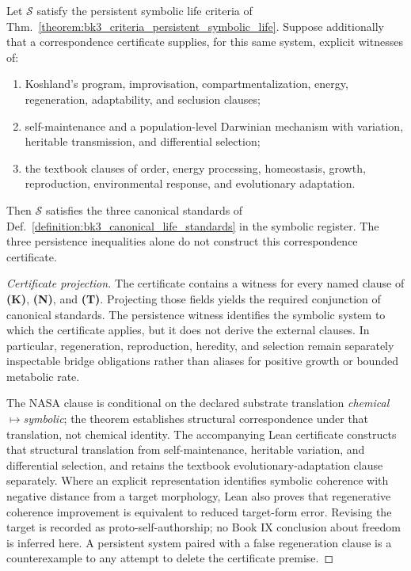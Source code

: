 \begin{theorem}
\label{theorem:bk3_symbolic_life_satisfies_canonical_definitions}
Let $\mathcal S$ satisfy the persistent symbolic life criteria of
Thm.~\ref{theorem:bk3_criteria_persistent_symbolic_life}.  Suppose additionally
that a correspondence certificate supplies, for this same system, explicit
witnesses of:
\begin{enumerate}
  \item Koshland's program, improvisation, compartmentalization, energy,
  regeneration, adaptability, and seclusion clauses;
  \item self-maintenance and a population-level Darwinian mechanism with
  variation, heritable transmission, and differential selection;
  \item the textbook clauses of order, energy processing, homeostasis, growth,
  reproduction, environmental response, and evolutionary adaptation.
\end{enumerate}
Then $\mathcal S$ satisfies the three canonical standards of
Def.~\ref{definition:bk3_canonical_life_standards} in the symbolic register.
The three persistence inequalities alone do not construct this correspondence
certificate.
\end{theorem}

\begin{proof}[Certificate projection]
\label{proof:bk3_symbolic_life_satisfies_canonical_definitions}
\leavevmode
The certificate contains a witness for every named clause of \textbf{(K)},
\textbf{(N)}, and \textbf{(T)}.  Projecting those fields yields the required
conjunction of canonical standards.  The persistence witness identifies the
symbolic system to which the certificate applies, but it does not derive the
external clauses.  In particular, regeneration, reproduction, heredity, and
selection remain separately inspectable bridge obligations rather than aliases
for positive growth or bounded metabolic rate.

The NASA clause is conditional on the declared substrate translation
\emph{chemical}$\mapsto$\emph{symbolic}; the theorem establishes structural
correspondence under that translation, not chemical identity.
The accompanying Lean certificate constructs that structural translation from
self-maintenance, heritable variation, and differential selection, and retains
the textbook evolutionary-adaptation clause separately.  Where an explicit
representation identifies symbolic coherence with negative distance from a
target morphology, Lean also proves that regenerative coherence improvement is
equivalent to reduced target-form error.  Revising the target is recorded as
proto-self-authorship; no Book IX conclusion about freedom is inferred here.  A persistent
system paired with a false regeneration clause is a counterexample to any
attempt to delete the certificate premise.
\end{proof}

